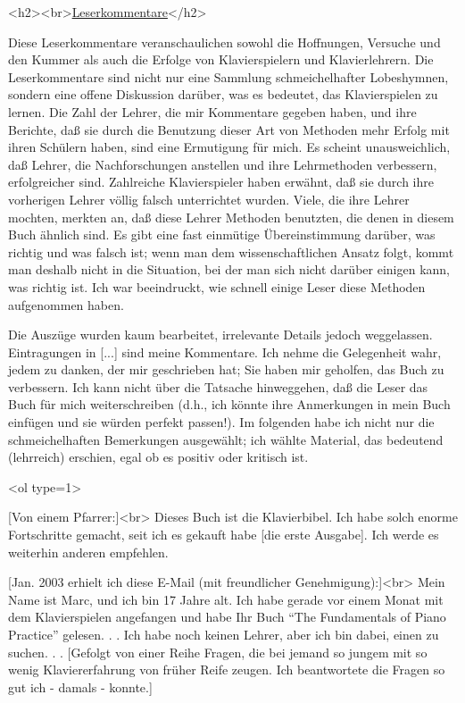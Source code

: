 
\hypertarget{testimonials}{}

<h2><br>\underline{Leserkommentare}</h2>

Diese Leserkommentare veranschaulichen sowohl die Hoffnungen, Versuche und den Kummer als auch die Erfolge von Klavierspielern und Klavierlehrern.
Die Leserkommentare sind nicht nur eine Sammlung schmeichelhafter Lobeshymnen, sondern eine offene Diskussion darüber, was es bedeutet, das Klavierspielen zu lernen.
Die Zahl der Lehrer, die mir Kommentare gegeben haben, und ihre Berichte, daß sie durch die Benutzung dieser Art von Methoden mehr Erfolg mit ihren Schülern haben, sind eine Ermutigung für mich.
Es scheint unausweichlich, daß Lehrer, die Nachforschungen anstellen und ihre Lehrmethoden verbessern, erfolgreicher sind.
Zahlreiche Klavierspieler haben erwähnt, daß sie durch ihre vorherigen Lehrer völlig falsch unterrichtet wurden.
Viele, die ihre Lehrer mochten, merkten an, daß diese Lehrer Methoden benutzten, die denen in diesem Buch ähnlich sind.
Es gibt eine fast einmütige Übereinstimmung darüber, was richtig und was falsch ist; wenn man dem wissenschaftlichen Ansatz folgt, kommt man deshalb nicht in die Situation, bei der man sich nicht darüber einigen kann, was richtig ist.
Ich war beeindruckt, wie schnell einige Leser diese Methoden aufgenommen haben.

Die Auszüge wurden kaum bearbeitet, irrelevante Details jedoch weggelassen.
Eintragungen in [...] sind meine Kommentare.
Ich nehme die Gelegenheit wahr, jedem zu danken, der mir geschrieben hat; Sie haben mir geholfen, das Buch zu verbessern.
Ich kann nicht über die Tatsache hinweggehen, daß die Leser das Buch für mich weiterschreiben (d.h., ich könnte ihre Anmerkungen in mein Buch einfügen und sie würden perfekt passen!).
Im folgenden habe ich nicht nur die schmeichelhaften Bemerkungen ausgewählt; ich wählte Material, das bedeutend (lehrreich) erschien, egal ob es positiv oder kritisch ist.


<ol type=1>

\item \hypertarget{testimonials01}{}
[Von einem Pfarrer:]<br>
Dieses Buch ist die Klavierbibel.
Ich habe solch enorme Fortschritte gemacht, seit ich es gekauft habe [die erste Ausgabe].
Ich werde es weiterhin anderen empfehlen.


\item \hypertarget{testimonials02}{}
[Jan. 2003 erhielt ich diese E-Mail (mit freundlicher Genehmigung):]<br>
Mein Name ist Marc, und ich bin 17 Jahre alt.
Ich habe gerade vor einem Monat mit dem Klavierspielen angefangen und habe Ihr Buch \enquote{The Fundamentals of Piano Practice} gelesen. . .
Ich habe noch keinen Lehrer, aber ich bin dabei, einen zu suchen. . .
[Gefolgt von einer Reihe Fragen, die bei jemand so jungem mit so wenig Klaviererfahrung von früher Reife zeugen.
Ich beantwortete die Fragen so gut ich - damals - konnte.]

